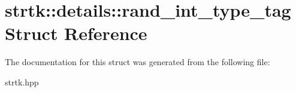 \hypertarget{structstrtk_1_1details_1_1rand__int__type__tag}{\section{strtk\-:\-:details\-:\-:rand\-\_\-int\-\_\-type\-\_\-tag Struct Reference}
\label{structstrtk_1_1details_1_1rand__int__type__tag}
}


The documentation for this struct was generated from the following file\-:\begin{DoxyCompactItemize}
\item 
strtk.\-hpp\end{DoxyCompactItemize}

